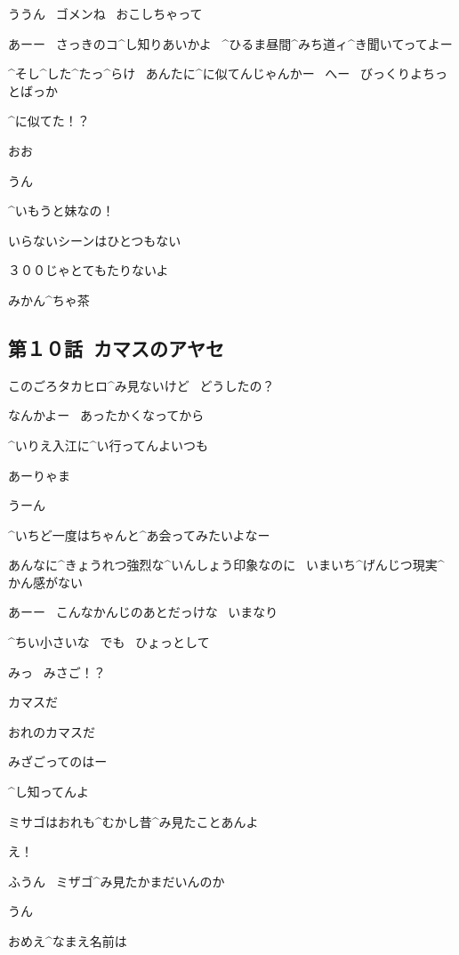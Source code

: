 \Alpha ううん
\ ゴメンね
\ おこしちゃって

\Ojisan あーー
\ さっきのコ^{し}{知}りあいかよ
\ ^{ひるま}{昼間}^{みち}{道}ィ^{き}{聞}いてってよー

\Ojisan ^{そ}{し}^{し}{た}^{た}{っ}^{ら}{け}
\ あんたに^{に}{似}てんじゃんかー
\ へー
\ びっくりよちっとばっか

\Alpha ^{に}{似}てた！？

\Ojisan おお

\page[34]
\Alpha うん

\Alpha ^{いもうと}{妹}なの！

\Alpha いらないシーンはひとつもない

\Alpha ３００じゃとてもたりないよ

\Sign みかん^{ちゃ}{茶}


\subsection{第１０話\ カマスのアヤセ}

\page[36]
\Alpha このごろタカヒロ^{み}{見}ないけど
\ どうしたの？

\Ojisan なんかよー
\ あったかくなってから

\Ojisan ^{いりえ}{入江}に^{い}{行}ってんよいつも

\Alpha あーりゃま

\page[37]
\Takahiro うーん

\Takahiro ^{いちど}{一度}はちゃんと^{あ}{会}ってみたいよなー

\page[38]
\Takahiro あんなに^{きょうれつ}{強烈}な^{いんしょう}{印象}なのに
\ いまいち^{げんじつ}{現実}^{かん}{感}がない

\Takahiro あーー
\ こんなかんじのあとだっけな
\ いまなり

\page[39]
\Takahiro ^{ちい}{小}さいな
\ でも
\ ひょっとして

\Takahiro みっ
\ みさご！？

\page[40]
\Ayase カマスだ

\Ayase おれのカマスだ

\Takahiro みざごってのはー

\Ayase ^{し}{知}ってんよ

\Ayase ミサゴはおれも^{むかし}{昔}^{み}{見}たことあんよ

\Takahiro え！

\page[41]
\Ayase ふうん
\ ミザゴ^{み}{見}たかまだいんのか

\Takahiro うん

\Ayase おめえ^{なまえ}{名前}は

